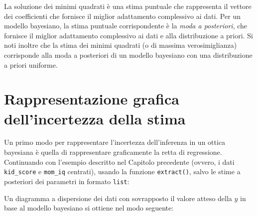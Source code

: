\documentclass[
  10pt,
  italian,
  a4paper,
  extrafontsizes,onecolumn,openright
  ]{memoir}
\newenvironment{Shaded}{\begin{snugshade}}{\end{snugshade}}
\newcommand{\AttributeTok}[1]{\textcolor[rgb]{0.77,0.63,0.00}{#1}}
\newcommand{\DecValTok}[1]{\textcolor[rgb]{0.00,0.00,0.81}{#1}}
\newcommand{\FunctionTok}[1]{\textcolor[rgb]{0.00,0.00,0.00}{#1}}
\newcommand{\NormalTok}[1]{#1}
\newcommand{\OtherTok}[1]{\textcolor[rgb]{0.56,0.35,0.01}{#1}}
\newcommand{\SpecialCharTok}[1]{\textcolor[rgb]{0.00,0.00,0.00}{#1}}
\newcommand{\StringTok}[1]{\textcolor[rgb]{0.31,0.60,0.02}{#1}}
\begin{document}
La soluzione dei minimi quadrati è una stima puntuale che rappresenta il vettore dei coefficienti che fornisce il miglior adattamento complessivo ai dati. Per un modello bayesiano, la stima puntuale corrispondente è la \emph{moda a posteriori}, che fornisce il miglior adattamento complessivo ai dati e alla distribuzione a priori. Si noti inoltre che la stima dei minimi quadrati (o di massima verosimiglianza) corrisponde alla moda a posteriori di un modello bayesiano con una distribuzione a priori uniforme.

\hypertarget{rappresentazione-grafica-dellincertezza-della-stima}{%
\section{Rappresentazione grafica dell'incertezza della stima}\label{rappresentazione-grafica-dellincertezza-della-stima}}

Un primo modo per rappresentare l'incertezza dell'inferenza in un ottica bayesiana è quella di rappresentare graficamente la retta di regressione. Continuando con l'esempio descritto nel Capitolo precedente (ovvero, i dati \texttt{kid\_score} e \texttt{mom\_iq} centrati), usando la funzione \texttt{extract()}, salvo le stime a posteriori dei parametri in formato \texttt{list}:

\begin{Shaded}
\end{Shaded}

Un diagramma a dispersione dei dati con sovrapposto il valore atteso della \(y\) in base al modello bayesiano si ottiene nel modo seguente:

\begin{Shaded}
\end{Shaded}
\end{document}
